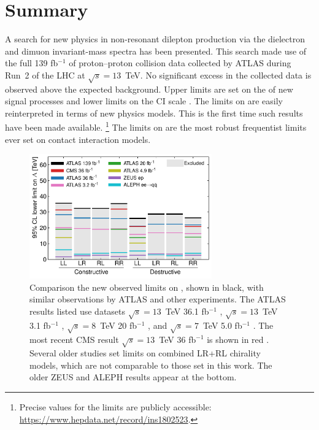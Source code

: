 \section{Summary}\label{sec:ciConclusion}

A search for new physics in non-resonant dilepton production via the dielectron and dimuon invariant-mass spectra has been presented.
This search made use of the full 139 fb$^{-1}$ of proton--proton collision data collected by ATLAS during Run~2 of the LHC at $\sqrt{s}=13$~TeV.
No significant excess in the collected data is observed above the expected background.
Upper limits are set on the \xsbr of new signal processes and lower limits on the CI scale \lam.
The limits on \xsbr are easily reinterpreted in terms of new physics models.
This is the first time such results have been made available.
\footnote{Precise values for the limits are publicly accessible: \url{https://www.hepdata.net/record/ins1802523}.}
The limits on \lam are the most robust frequentist limits ever set on contact interaction models.

\begin{figure}[htb]
\centering
\includegraphics[width=0.70\textwidth]{figures/ci/results/hist-lambda-ll-Lambda.pdf}
\caption{
Comparison the new observed limits on \lam, shown in black, with similar \ll observations by ATLAS and other experiments.
The ATLAS results listed use datasets $\sqrt{s}=13$~TeV 36.1 fb$^{-1}$ \cite{EXOT-2016-05}, $\sqrt{s}=13$~TeV 3.1 fb$^{-1}$ \cite{EXOT-2015-07}, $\sqrt{s}=8$~TeV 20 fb$^{-1}$ \cite{EXOT-2013-19}, and $\sqrt{s}=7$~TeV 5.0 fb$^{-1}$ \cite{EXOT-2012-17}.
The most recent CMS result $\sqrt{s}=13$~TeV 36 fb$^{-1}$ is shown in red \cite{cmsCi}.
Several older studies set limits on combined LR+RL chirality models, which are not comparable to those set in this work.
The older ZEUS \cite{zeusCi} and ALEPH \cite{alephCi} results appear at the bottom.
}
\label{fig:ciHistoricalLimits}
\end{figure}

